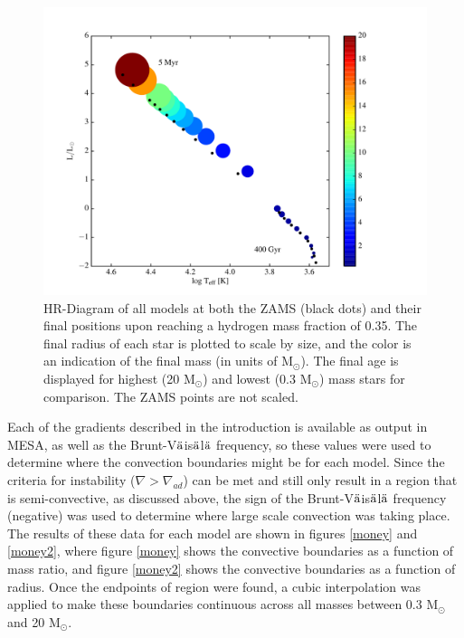 \documentclass[12pt]{article}
\begin{document}
\begin{figure}
  \centering
  \includegraphics[width=7.0in]{hr_diagram.pdf}
  \caption{HR-Diagram of all models at both the ZAMS
  (black dots) and their final positions upon reaching a hydrogen mass
  fraction of 0.35. The final radius of each star is plotted to scale by
  size, and the color is an indication of the final mass (in units of
  M$_{\odot}$). The final age
  is displayed for highest (20 M$_{\odot}$) and lowest (0.3
  M$_{\odot}$) mass stars for comparison. The ZAMS points are not
  scaled.}
  \label{hr_diagram}
\end{figure}

\noindent
 Each of the gradients described in the introduction is
available as output in MESA, as well as the
Brunt-V$\ddot{\rm a}$is$\ddot{\rm a}$l$\ddot{\rm a}$
frequency,
 so these values were used to determine where
 the convection boundaries might be for each model.
 Since the criteria for instability ($\nabla > \nabla_{ad}$) can be met
 and still only result in a region that is semi-convective, as discussed
 above, the sign of the
Brunt-V$\ddot{\rm a}$is$\ddot{\rm a}$l$\ddot{\rm a}$
frequency (negative)
 was used to determine where large scale convection was taking place.
The results of these data for each model
are shown in figures \ref{money} and
\ref{money2}, where figure \ref{money} shows the convective boundaries as a
function of mass ratio, and figure \ref{money2} shows the convective
boundaries as a function of radius. Once the endpoints of region were found,
a cubic interpolation was applied to make these boundaries continuous across
all masses between 0.3 M$_{\odot}$ and 20 M$_{\odot}$.\\
\end{document}
